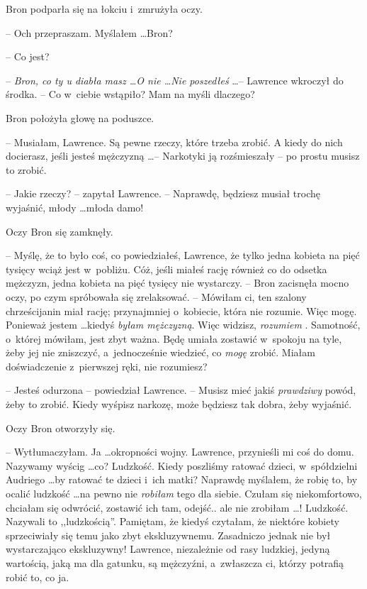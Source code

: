 \documentclass[oneside,polish,11pt,rmheadings]{mwbk}
\begin{document}
Bron podparła się na łokciu i~zmrużyła oczy. 

-- Och przepraszam. Myślałem \ldots  Bron? 

--  Co jest?  

-- \textit{Bron, co ty u diabła masz \ldots   O nie \ldots  Nie poszedłeś } \ldots  --  Lawrence wkroczył do środka. -- Co w~ciebie wstąpiło? Mam na myśli dlaczego?  

Bron położyła głowę na poduszce.

-- Musiałam, Lawrence. Są pewne rzeczy, które trzeba zrobić. A kiedy do nich docierasz, jeśli jesteś mężczyzną \ldots  -- Narkotyki ją rozśmieszały -- po prostu musisz to zrobić. 

-- Jakie rzeczy? -- zapytał Lawrence. -- Naprawdę, będziesz musiał trochę wyjaśnić, młody \ldots  młoda damo! 

Oczy Bron się zamknęły. 

-- Myślę, że to było coś, co powiedziałeś, Lawrence, że tylko jedna kobieta na pięć tysięcy wciąż jest w~pobliżu. Cóż, jeśli miałeś rację również co do odsetka mężczyzn, jedna kobieta na pięć tysięcy nie wystarczy. -- Bron zacisnęła mocno oczy, po czym spróbowała się zrelaksować. -- Mówiłam ci, ten szalony chrześcijanin miał rację; przynajmniej o~kobiecie, która nie rozumie. Więc mogę. Ponieważ jestem \ldots  kiedyś \textit{byłam mężczyzną}. Więc widzisz, \textit{rozumiem }. Samotność, o~której mówiłam, jest zbyt ważna. Będę umiała zostawić w~spokoju na tyle, żeby jej nie zniszczyć, a~jednocześnie wiedzieć, co \textit{mogę }zrobić. Miałam doświadczenie z~pierwszej ręki, nie rozumiesz? 

-- Jesteś odurzona -- powiedział Lawrence. -- Musisz mieć jakiś \textit{prawdziwy }powód, żeby to zrobić. Kiedy wyśpisz narkozę, może będziesz tak dobra, żeby wyjaśnić. 

Oczy Bron otworzyły się. 

-- Wytłumaczyłam. Ja \ldots  okropności wojny. Lawrence, przynieśli mi coś do domu. Nazywamy wyścig \ldots  co? Ludzkość. Kiedy poszliśmy ratować dzieci, w~spółdzielni Audriego \ldots  by ratować te dzieci i~ich matki? Naprawdę myślałem, że robię to, by ocalić ludzkość \ldots  na pewno nie \textit{robiłam }tego dla siebie. Czułam się niekomfortowo, chciałam się odwrócić, zostawić ich tam, odejść.. ale nie zrobiłam \ldots  ! Ludzkość. Nazywali to ,,ludzkością''. Pamiętam, że kiedyś czytałam, że niektóre kobiety sprzeciwiały się temu jako zbyt ekskluzywnemu. Zasadniczo jednak nie był wystarczająco ekskluzywny! Lawrence, niezależnie od rasy ludzkiej, jedyną wartością, jaką ma dla gatunku, są mężczyźni, a~zwłaszcza ci, którzy potrafią robić to, co ja. 
\end{document}
